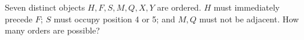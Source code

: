 Seven distinct objects $H,F,S,M,Q,X,Y$ are ordered. $H$ must immediately precede $F$; $S$ must occupy position 4 or 5; and $M,Q$ must not be adjacent. How many orders are possible?
